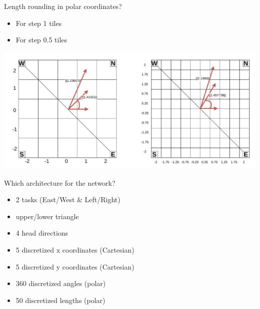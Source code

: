 \documentclass[bigger]{beamer}
\begin{document}
\begin{frame}[label={sec:org07eb502}]{Length rounding in polar coordinates?}
\begin{itemize}
\item For step 1 tiles
\item For step 0.5 tiles
\end{itemize}
\begin{center}
\includegraphics[width=.9\linewidth]{img/polar-discretized-length.drawio.pdf}
\end{center}
\end{frame}
\begin{frame}[label={sec:orgc984c75}]{Which architecture for the network?}
\begin{itemize}
\item 2 tasks (East/West \& Left/Right)
\item upper/lower triangle
\item 4 head directions
\item 5 discretized x coordinates (Cartesian)
\item 5 discretized y coordinates (Cartesian)
\item 360 discretized angles (polar)
\item 50 discretized lengths (polar)
\end{itemize}
\end{frame}
\end{document}
